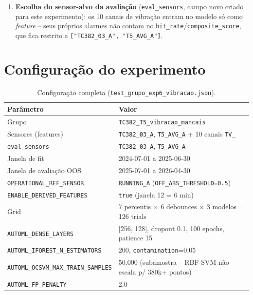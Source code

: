 \documentclass[11pt,a4paper]{article}
\begin{document}
\begin{enumerate}[leftmargin=*]
\item \textbf{Escolha do sensor-alvo da avaliação} (\texttt{eval\_sensors},
  campo novo criado para este experimento): os 10 canais de vibração
  entram no modelo só como \emph{feature} -- seus próprios alarmes não
  contam no \texttt{hit\_rate}/\texttt{composite\_score}, que fica restrito
  a \texttt{["TC382\_03\_A", "T5\_AVG\_A"]}.

\end{enumerate}

\section{Configuração do experimento}

\begin{table}[H]
\centering
\small
\begin{tabular}{@{}ll@{}}
\toprule
\textbf{Parâmetro} & \textbf{Valor} \\
\midrule
Grupo & \texttt{TC382\_T5\_vibracao\_mancais} \\
Sensores (features) & \texttt{TC382\_03\_A}, \texttt{T5\_AVG\_A} + 10 canais \texttt{TV\_} \\
\texttt{eval\_sensors} & \texttt{TC382\_03\_A}, \texttt{T5\_AVG\_A} \\
Janela de fit & 2024-07-01 a 2025-06-30 \\
Janela de avaliação OOS & 2025-07-01 a 2026-04-30 \\
\texttt{OPERATIONAL\_REF\_SENSOR} & \texttt{RUNNING\_A} (\texttt{OFF\_ABS\_THRESHOLD=0.5}) \\
\texttt{ENABLE\_DERIVED\_FEATURES} & \texttt{true} (janela 12 = 6 min) \\
Grid & 7 percentis $\times$ 6 debounces $\times$ 3 modelos = 126 trials \\
\texttt{AUTOML\_DENSE\_LAYERS} & [256, 128], dropout 0.1, 100 epochs, patience 15 \\
\texttt{AUTOML\_IFOREST\_N\_ESTIMATORS} & 200, \texttt{contamination}=0.05 \\
\texttt{AUTOML\_OCSVM\_MAX\_TRAIN\_SAMPLES} & 50.000 (subamostra -- RBF-SVM não escala p/ 380k+ pontos) \\
\texttt{AUTOML\_FP\_PENALTY} & 2.0 \\
\bottomrule
\end{tabular}
\caption{Configuração completa (\texttt{test\_grupo\_exp6\_vibracao.json}).}
\end{table}
\end{document}
